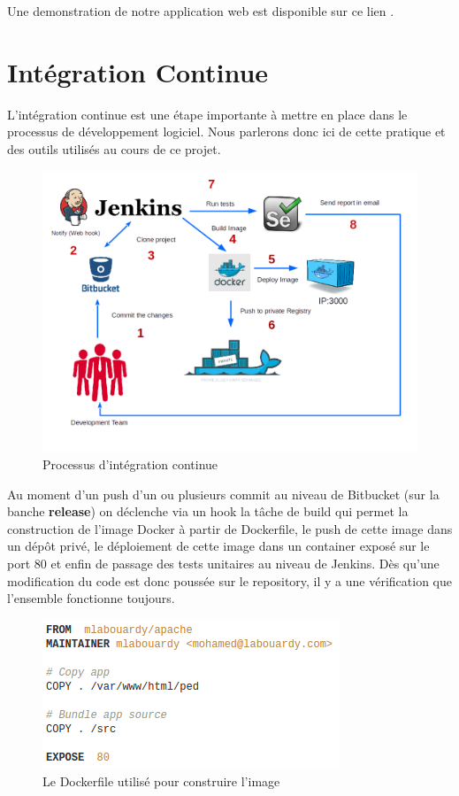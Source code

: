 \documentclass [a4paper,11pt]{article}
\begin{document}
Une demonstration de notre application web est disponible sur ce lien \cite{APPLI}.

\newpage

\section{Intégration Continue}

L'intégration continue est une étape importante à mettre en place dans le processus de développement logiciel. Nous parlerons donc ici de cette pratique et des outils utilisés au cours de ce projet.

\begin{figure}[H]
\centering
\includegraphics[scale=0.5]{img/ci.png}
\caption{Processus d'intégration continue}
\end{figure}

Au moment d’un push d’un ou plusieurs commit au niveau de Bitbucket (sur la banche \textbf{release}) on déclenche via un hook la tâche de build qui permet la construction de l'image Docker à partir de Dockerfile, le push de cette image dans un dépôt privé, le déploiement de cette image dans un container exposé sur le port 80 et enfin de passage des tests unitaires au niveau de Jenkins. Dès qu’une modification du code est donc poussée sur le repository, il y a une vérification que l’ensemble fonctionne toujours.

\newpage

\begin{figure}[H]
\centering
\includegraphics[scale=0.7]{img/Dockerfile.png}
\caption {Le Dockerfile utilisé pour construire l'image}
\end{figure}
\end{document}
